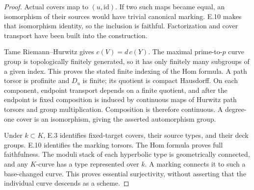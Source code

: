 \begin{proof}
Actual covers map to $(u,\mathrm{id})$. If two such maps became
equal, an isomorphism of their sources would have trivial
canonical marking. E.10 makes that isomorphism identity, so the
inclusion is faithful. Factorization and cover transport have
been built into the construction.

Tame Riemann--Hurwitz gives $c(V)=d\,c(Y)$. The maximal
prime-to-$p$ curve group is topologically finitely generated,
so it has only finitely many subgroups of a given index.
This proves the stated finite indexing of the Hom formula.
A path torsor is profinite and $D_u$ is finite; its quotient
is compact Hausdorff. On each component, endpoint transport
depends on a finite quotient, and after the endpoint is fixed
composition is induced by continuous maps of Hurwitz path
torsors and group multiplication. Composition is therefore
continuous. A degree-one cover is an isomorphism, giving the
asserted automorphism group.

Under $k\subset K$, E.3 identifies fixed-target covers, their
source types, and their deck groups. E.10 identifies the marking
torsors. The Hom formula proves full faithfulness. The moduli
stack of each hyperbolic type is geometrically connected, and
any $K$-curve has a type represented over $k$. A marking
connects it to such a base-changed curve. This proves essential
surjectivity, without asserting that the individual curve
descends as a scheme.
\end{proof}

